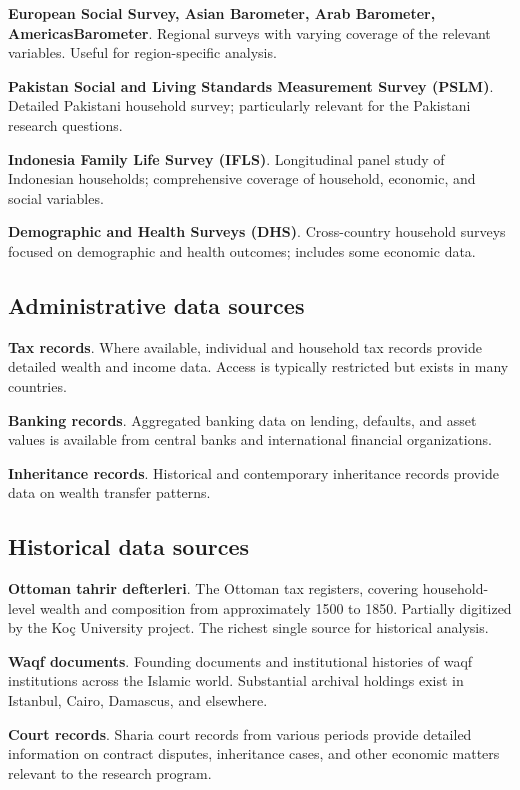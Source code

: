 \textbf{European Social Survey, Asian Barometer, Arab Barometer,
AmericasBarometer}. Regional surveys with varying coverage of the
relevant variables. Useful for region-specific analysis.

\textbf{Pakistan Social and Living Standards Measurement Survey
(PSLM)}. Detailed Pakistani household survey; particularly relevant
for the Pakistani research questions.

\textbf{Indonesia Family Life Survey (IFLS)}. Longitudinal panel
study of Indonesian households; comprehensive coverage of
household, economic, and social variables.

\textbf{Demographic and Health Surveys (DHS)}. Cross-country
household surveys focused on demographic and health outcomes;
includes some economic data.

\subsection{Administrative data sources}

\textbf{Tax records}. Where available, individual and household
tax records provide detailed wealth and income data. Access is
typically restricted but exists in many countries.

\textbf{Banking records}. Aggregated banking data on lending,
defaults, and asset values is available from central banks and
international financial organizations.

\textbf{Inheritance records}. Historical and contemporary
inheritance records provide data on wealth transfer patterns.

\subsection{Historical data sources}

\textbf{Ottoman tahrir defterleri}. The Ottoman tax registers,
covering household-level wealth and composition from approximately
1500 to 1850. Partially digitized by the Ko\c{c} University
project. The richest single source for historical analysis.

\textbf{Waqf documents}. Founding documents and institutional
histories of waqf institutions across the Islamic world.
Substantial archival holdings exist in Istanbul, Cairo, Damascus,
and elsewhere.

\textbf{Court records}. Sharia court records from various periods
provide detailed information on contract disputes, inheritance
cases, and other economic matters relevant to the research
program.

